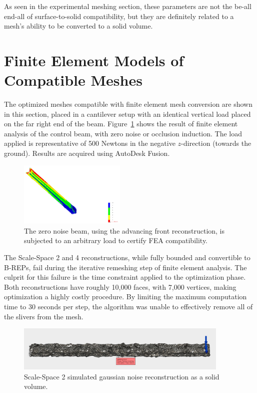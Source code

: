 \documentclass[12pt]{drexelthesis}
\let\Oldsection\section
\renewcommand{\section}{\FloatBarrier\Oldsection}
\begin{document}
As seen in the experimental meshing section, these parameters are not the be-all end-all of surface-to-solid compatibility, but they are definitely related to a mesh's ability to be converted to a solid volume.

\section{Finite Element Models of Compatible Meshes}
\label{sec:FEAresults}
The optimized meshes compatible with finite element mesh conversion are shown in this section, placed in a cantilever setup with an identical vertical load placed on the far right end of the beam. Figure~\ref{conc:zeronoiseload} shows the result of finite element analysis of the control beam, with zero noise or occlusion induction. The load applied is representative of 500 Newtons in the negative $z$-direction (towards the ground). Results are acquired using AutoDesk Fusion. 

\begin{figure}[!ht]
	\centering
		\includegraphics[width=2in]{conclusion/zeronoiseFEA.png}
		\caption[FEA loading results on the zero noise beam]{\centering The zero noise beam, using the advancing front reconstruction, is subjected to an arbitrary load to certify FEA compatibility.}
	\label{conc:zeronoiseload}
\end{figure} 

The Scale-Space 2 and 4 reconstructions, while fully bounded and convertible to B-REPs, fail during the iterative remeshing step of finite element analysis. The culprit for this failure is the time constraint applied to the optimization phase. Both reconstructions have roughly 10,000 faces, with 7,000 vertices, making optimization a highly costly procedure. By limiting the maximum computation time to 30 seconds per step, the algorithm was unable to effectively remove all of the slivers from the mesh. 

\begin{figure}[!ht]
	\centering
		\includegraphics[width=4in]{conclusion/noiseSS2Bounded.jpg}
		\caption[Optimized gaussian noise reconstruction as a solid volume]{\centering Scale-Space 2 simulated gaussian noise reconstruction as a solid volume.}
	\label{conc:gnoisesolid}
\end{figure}
\end{document}
